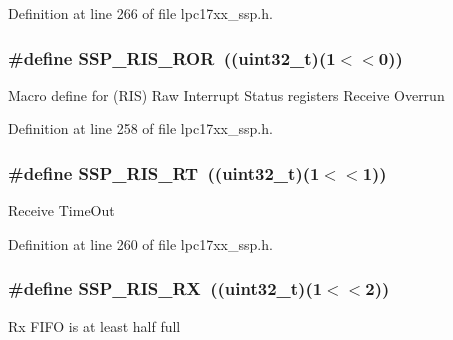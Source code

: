 \-Definition at line 266 of file lpc17xx\-\_\-ssp.\-h.

\hypertarget{group___s_s_p___private___macros_ga0556e3aaa7aefef2c8ed76e1efbf277c}{
\subsubsection[{\-S\-S\-P\-\_\-\-R\-I\-S\-\_\-\-R\-O\-R}]{\setlength{\rightskip}{0pt plus 5cm}\#define {\bf \-S\-S\-P\-\_\-\-R\-I\-S\-\_\-\-R\-O\-R}~((uint32\-\_\-t)(1$<$$<$0))}}\label{group___s_s_p___private___macros_ga0556e3aaa7aefef2c8ed76e1efbf277c}
\-Macro define for (\-R\-I\-S) \-Raw \-Interrupt \-Status registers \-Receive \-Overrun 

\-Definition at line 258 of file lpc17xx\-\_\-ssp.\-h.

\hypertarget{group___s_s_p___private___macros_gaf3ca75688f2b02dc4df0c1812d246baf}{
\subsubsection[{\-S\-S\-P\-\_\-\-R\-I\-S\-\_\-\-R\-T}]{\setlength{\rightskip}{0pt plus 5cm}\#define {\bf \-S\-S\-P\-\_\-\-R\-I\-S\-\_\-\-R\-T}~((uint32\-\_\-t)(1$<$$<$1))}}\label{group___s_s_p___private___macros_gaf3ca75688f2b02dc4df0c1812d246baf}
\-Receive \-Time\-Out 

\-Definition at line 260 of file lpc17xx\-\_\-ssp.\-h.

\hypertarget{group___s_s_p___private___macros_gad5b9b44272a78e2dcfa4f11b560a1ac5}{
\subsubsection[{\-S\-S\-P\-\_\-\-R\-I\-S\-\_\-\-R\-X}]{\setlength{\rightskip}{0pt plus 5cm}\#define {\bf \-S\-S\-P\-\_\-\-R\-I\-S\-\_\-\-R\-X}~((uint32\-\_\-t)(1$<$$<$2))}}\label{group___s_s_p___private___macros_gad5b9b44272a78e2dcfa4f11b560a1ac5}
\-Rx \-F\-I\-F\-O is at least half full 

